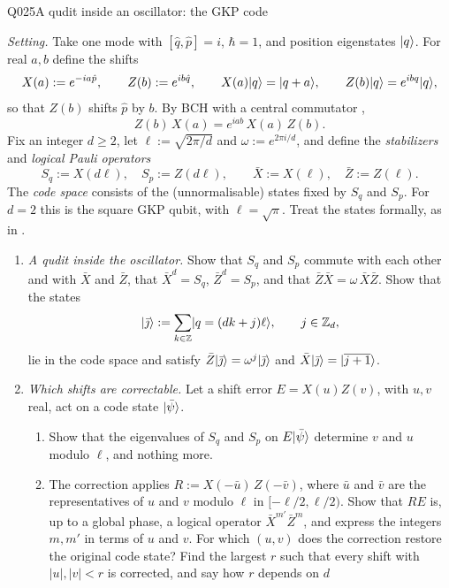 \begin{entry}{Q025}{A qudit inside an oscillator: the GKP code}
\begin{problem}
\emph{Setting.} Take one mode with $[\hat q,\hat p]=i$, $\hbar=1$, and position
eigenstates $\lvert q \rangle$. For real $a,b$ define the shifts
\begin{equation}
  X(a):=e^{-ia\hat p},\qquad Z(b):=e^{ib\hat q},
  \qquad X(a)\lvert q \rangle=\lvert q+a \rangle,\qquad Z(b)\lvert q \rangle=e^{ibq}\lvert q \rangle ,
  \label{q025:shifts}
\end{equation}
so that $Z(b)$ shifts $\hat p$ by $b$. By BCH with a central commutator ,
\begin{equation}
  Z(b)\,X(a)=e^{iab}\,X(a)\,Z(b).
  \label{q025:weyl}
\end{equation}
Fix an integer $d\ge2$, let $\ell:=\sqrt{2\pi/d}$ and $\omega:=e^{2\pi i/d}$, and define
the \emph{stabilizers} and \emph{logical Pauli operators}
\begin{equation}
  S_q:=X(d\ell),\quad S_p:=Z(d\ell),\qquad \bar X:=X(\ell),\quad \bar Z:=Z(\ell).
  \label{q025:code}
\end{equation}
The \emph{code space} consists of the (unnormalisable) states fixed by $S_q$ and $S_p$. For
$d=2$ this is the square GKP qubit, with $\ell=\sqrt\pi$. Treat the states formally, as in
.

\begin{enumerate}[label=\textbf{(\alph*)},leftmargin=*]
  \item \emph{A qudit inside the oscillator.} Show that $S_q$ and $S_p$ commute with each
        other and with $\bar X$ and $\bar Z$, that $\bar X^{d}=S_q$, $\bar Z^{d}=S_p$, and
        that $\bar Z\bar X=\omega\,\bar X\bar Z$. Show that the states
        \begin{equation}
          \lvert \bar\jmath \rangle:=\sum_{k\in\mathbb{Z}}\lvert q=(dk+j)\ell \rangle,\qquad j\in\mathbb{Z}_d ,
          \label{q025:codewords}
        \end{equation}
        lie in the code space and satisfy $\bar Z\lvert \bar\jmath \rangle=\omega^{j}\lvert \bar\jmath \rangle$
        and $\bar X\lvert \bar\jmath \rangle=\lvert \overline{j+1} \rangle$.

  \item \emph{Which shifts are correctable.} Let a shift error $E=X(u)Z(v)$, with $u,v$
        real, act on a code state $\lvert \bar\psi \rangle$.
        \begin{enumerate}[label=(\roman*)]
          \item Show that the eigenvalues of $S_q$ and $S_p$ on $E\lvert \bar\psi \rangle$
                determine $v$ and $u$ modulo $\ell$, and nothing more.
          \item The correction applies $R:=X(-\bar u)\,Z(-\bar v)$, where $\bar u$ and
                $\bar v$ are the representatives of $u$ and $v$ modulo $\ell$ in
                $[-\ell/2,\ell/2)$. Show that $RE$ is, up to a global phase, a logical
                operator $\bar X^{m'}\bar Z^{m}$, and express the integers $m,m'$ in terms
                of $u$ and $v$. For which $(u,v)$ does the correction restore the original
                code state? Find the largest $r$ such that every shift with $|u|,|v|<r$ is corrected, and say how $r$ depends on $d$
            \end{enumerate}


\end{enumerate}
\end{problem}
\end{entry}
